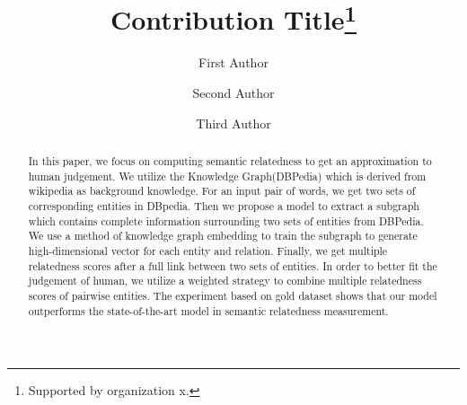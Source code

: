 \documentclass[runningheads]{llncs}
\begin{document}
  \title{Contribution Title\thanks{Supported by organization x.}}
  \author{First Author \and
  Second Author \and
  Third Author}
  \maketitle              %
  \begin{abstract}
    In this paper, we focus on computing semantic relatedness to get an approximation to human judgement.
    We utilize the Knowledge Graph(DBPedia) which is derived from wikipedia as background knowledge.
    For an input pair of words, we get two sets of corresponding entities in DBpedia.
    Then we propose a model to extract a subgraph which contains complete information surrounding two sets of entities from DBPedia.
    We use a method of knowledge graph embedding to train the subgraph to generate high-dimensional vector for each entity and relation. 
    Finally, we get multiple relatedness scores after a full link between two sets of entities.
    In order to better fit the judgement of human, we utilize a weighted strategy to combine
    multiple relatedness scores of pairwise entities.
    The experiment based on gold dataset shows that our model outperforms the state-of-the-art model in semantic relatedness measurement.
  
  \end{abstract}
  
  
  
  
  

  
  
  
\end{document}

